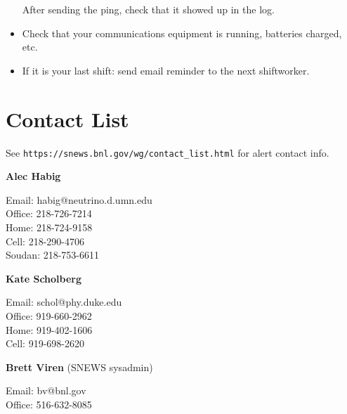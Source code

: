 \documentclass{article}
\begin{document}
\begin{itemize}
After sending the ping, check that it showed up in the log. 


\item Check that your communications equipment is running,
batteries charged, etc.

\item If it is your last shift: send email reminder to the
next shiftworker.

\end{itemize}

\newpage

\section{Contact List}      


See \texttt{https://snews.bnl.gov/wg/contact\_list.html} for 
alert contact info.\\
\vspace{0.05in}

\noindent
\textbf{Alec Habig}

\noindent
Email: habig@neutrino.d.umn.edu\\
Office: 218-726-7214\\
Home: 218-724-9158\\
Cell: 218-290-4706\\
Soudan: 218-753-6611\\

\vspace{0.05in}

\noindent
\textbf{Kate Scholberg}

\noindent
Email: schol@phy.duke.edu\\
Office: 919-660-2962\\
Home: 919-402-1606 \\
Cell: 919-698-2620\\

\vspace{0.05in}

\noindent
\textbf{Brett Viren} (SNEWS sysadmin)

\noindent
Email: bv@bnl.gov\\
Office: 516-632-8085\\
\end{document}
